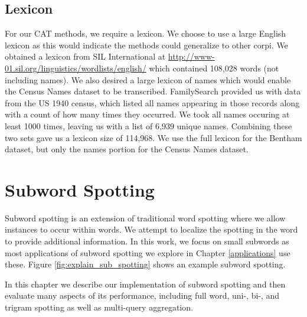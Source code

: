 \documentclass[ms,electronic,twosidetoc,letterpaper,chaptercenter,parttop,lol,lof,lot]{byumsphd}
\begin{document}
\section{Lexicon}

For our CAT methods, we require a lexicon. We choose to use a large English lexicon as this would indicate the methods could generalize to other corpi. We obtained a lexicon from SIL International at \url{http://www-01.sil.org/linguistics/wordlists/english/} which contained 108,028 words (not including names). We also desired a large lexicon of names which would enable the Census Names dataset to be transcribed. FamilySearch provided us with data from the US 1940 census, which listed all names appearing in those records along with a count of how many times they occurred. We took all names occuring at least 1000 times, leaving us with a list of 6,939 unique names. Combining these two sets gave us a lexicon size of 114,968. We use the full lexicon for the Bentham dataset, but only the names portion for the Census Names dataset.

\chapter{Subword Spotting}\label{subwordspotting}

Subword spotting is an extension of traditional word spotting where we allow instances to occur within words. We attempt to localize the spotting in the word to provide additional information. In this work, we focus on small subwords as most applications of subword spotting we explore in Chapter \ref{applications} use these. Figure \ref{fig:explain_sub_spotting} shows an example subword spotting.

In this chapter we describe our implementation of subword spotting and then evaluate many aspects of its performance, including full word, uni-, bi-, and trigram spotting as well as multi-query aggregation.
\end{document}
